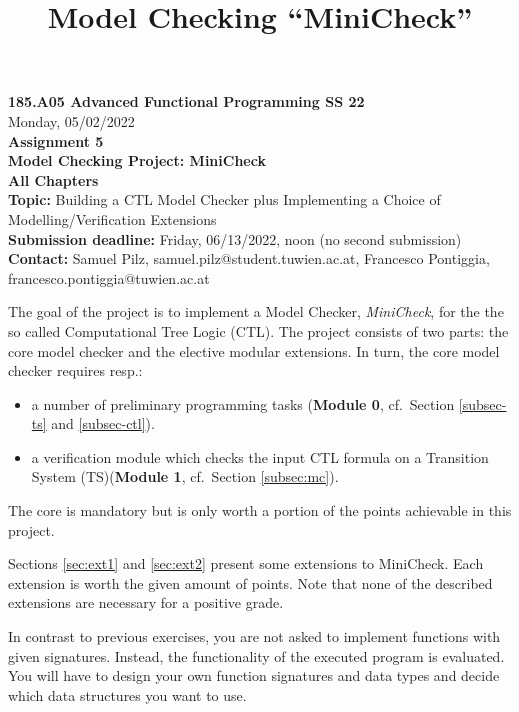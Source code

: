 \documentclass{article}
\title{Model Checking ``MiniCheck''}
\begin{document}
\large
\thispagestyle{empty}
\begin{center}
  {\Large \textbf{185.A05 Advanced Functional Programming SS 22}}  \\ [1ex] 
            Monday, 05/02/2022 \\
               {\Large \textbf{Assignment 5}} \\[.5ex]
              {\Large \textbf{Model Checking Project: MiniCheck}} \\[.5ex]
                 \textbf{All Chapters}  \\ [.75ex]
           \textbf{Topic:} Building a CTL Model Checker plus Implementing a Choice of Modelling/Verification Extensions  \\[1ex]
          \textbf{Submission deadline:} Friday, 06/13/2022, noon (no second submission)  \\ [0.5ex]
          \textbf{Contact:} Samuel Pilz, samuel.pilz@student.tuwien.ac.at, 
                            Francesco Pontiggia, francesco.pontiggia@tuwien.ac.at 
\end{center}

\vspace{1ex}
\noindent
\noindent

\newcommand{\code}[1]{\texttt{#1}}

\noindent
The goal of the project is to implement a  Model Checker, \textit{MiniCheck}, 
for the the so called Computational Tree Logic (CTL). 
The project consists of two parts: the core model checker and the elective modular extensions. 
In turn, the core model checker requires resp.: 
\begin{itemize}
    \item a number of preliminary programming tasks (\textbf{Module 0}, cf.~Section \ref{subsec-ts} and \ref{subsec-ctl}).
    \item a verification module which checks the input CTL formula on a Transition System (TS)(\textbf{Module 1}, cf.~Section \ref{subsec:mc}).

\end{itemize}  
The core is mandatory but is only worth a portion of the points achievable in this project.

Sections  \ref{sec:ext1} and \ref{sec:ext2} present some extensions to MiniCheck. Each extension is worth the given amount of points. Note that none of the described extensions are necessary for a positive grade.

In contrast to previous exercises, you are not asked to implement functions with given signatures. 
Instead, the functionality of the executed program is evaluated. 
You will have to design your own function signatures and data types and decide 
which data structures you want to use.
\end{document}
